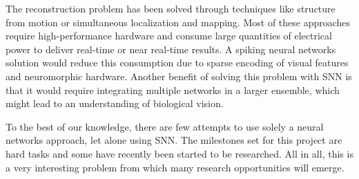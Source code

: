 The reconstruction problem has been solved through techniques like structure from motion or simultaneous localization and mapping. Most of these approaches require high-performance hardware and consume large quantities of electrical power to deliver real-time or near real-time results. A spiking neural networks solution would reduce this consumption due to sparse encoding of visual features and neuromorphic hardware. Another benefit of solving this problem with SNN is that it would require integrating multiple networks in a larger ensemble, which might lead to an understanding of biological vision.

To the best of our knowledge, there are few attempts to use solely a neural networks approach, let alone using SNN. The milestones set for this project are hard tasks and some have recently been started to be researched. All in all, this is a very interesting problem from which many research opportunities will emerge.